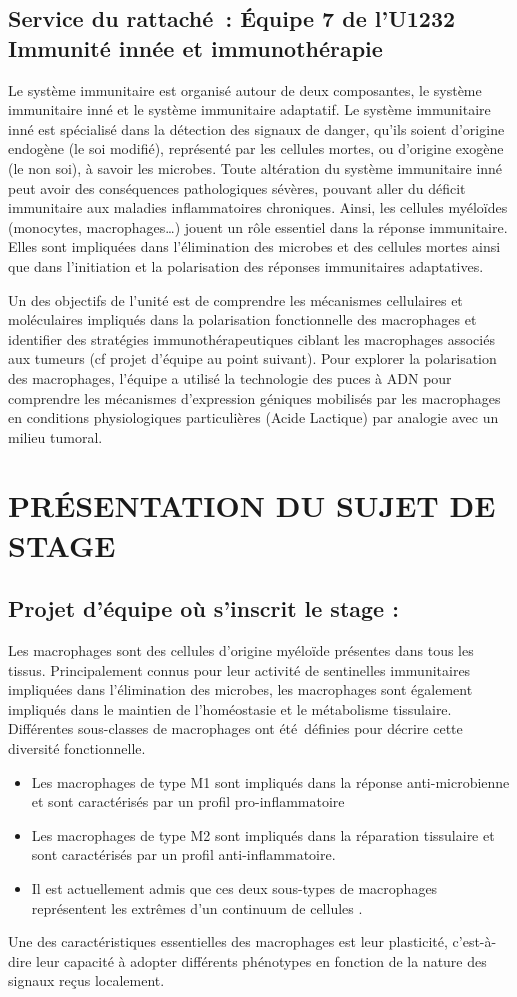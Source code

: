 \documentclass[a4paper,10pt]{article}
\begin{document}
\subsection{Service du rattaché : Équipe 7 de l’U1232 Immunité innée et immunothérapie}
Le système immunitaire est organisé autour de deux composantes, le système immunitaire inné et le système immunitaire adaptatif. Le système immunitaire inné est spécialisé dans la détection des signaux de danger, qu’ils soient d’origine endogène (le soi modifié), représenté par les cellules mortes, ou d’origine exogène (le non soi), à savoir les microbes. 
Toute altération du système immunitaire inné peut avoir des conséquences pathologiques sévères, pouvant aller du déficit immunitaire aux maladies inflammatoires chroniques. Ainsi, les cellules myéloïdes (monocytes, macrophages…) jouent un rôle essentiel dans la réponse immunitaire. Elles sont impliquées dans l’élimination des microbes et des cellules mortes ainsi que dans l’initiation et la polarisation des réponses immunitaires adaptatives. 

Un des objectifs de l’unité est de comprendre les mécanismes cellulaires et moléculaires impliqués dans la polarisation fonctionnelle des macrophages et identifier des stratégies immunothérapeutiques ciblant les macrophages associés aux tumeurs (cf projet d’équipe au point suivant). 
Pour explorer la polarisation des macrophages, l’équipe a utilisé la technologie des puces à ADN pour comprendre les mécanismes d’expression géniques mobilisés par les macrophages en conditions physiologiques particulières (Acide Lactique) par analogie avec un milieu tumoral. 
\section{PR\'{E}SENTATION DU SUJET DE STAGE }
\subsection{Projet d’équipe où s’inscrit le stage :}
Les macrophages sont des cellules d’origine myéloïde présentes dans tous les tissus.
Principalement connus pour leur activité de sentinelles immunitaires impliquées dans l’élimination des microbes, les macrophages sont également impliqués dans le maintien de l’homéostasie et le métabolisme tissulaire. Différentes sous-classes de macrophages ont été définies pour décrire cette diversité fonctionnelle. 
\begin{itemize}
 \item Les macrophages de type M1 sont impliqués dans la réponse anti-microbienne et sont caractérisés par un profil pro-inflammatoire 
\item Les macrophages de type M2 sont impliqués dans la réparation tissulaire et sont caractérisés par un profil anti-inflammatoire. 
\item Il est actuellement admis que ces deux sous-types de macrophages représentent les extrêmes d’un continuum de cellules \cite{sica2012macrophage}.
\end{itemize}
Une des caractéristiques essentielles des macrophages est leur plasticité, c’est-à-dire leur capacité à adopter différents phénotypes en fonction de la nature des signaux reçus localement.
 
\end{document}
